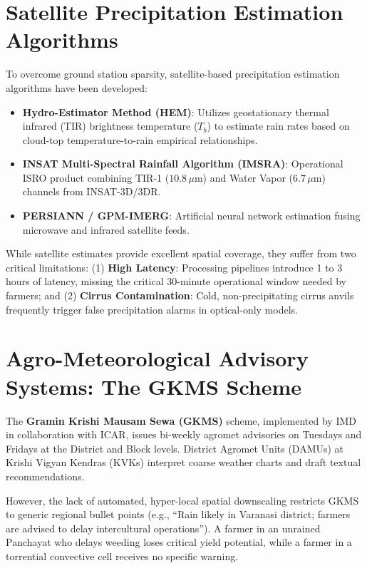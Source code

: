 \documentclass[11pt,a4paper,oneside]{report}
\begin{document}
\section{Satellite Precipitation Estimation Algorithms}
To overcome ground station sparsity, satellite-based precipitation estimation algorithms have been developed:
\begin{itemize}[leftmargin=*]
    \item \textbf{Hydro-Estimator Method (HEM)}: Utilizes geostationary thermal infrared (TIR) brightness temperature ($T_b$) to estimate rain rates based on cloud-top temperature-to-rain empirical relationships.
    \item \textbf{INSAT Multi-Spectral Rainfall Algorithm (IMSRA)}: Operational ISRO product combining TIR-1 ($10.8\,\mu\text{m}$) and Water Vapor ($6.7\,\mu\text{m}$) channels from INSAT-3D/3DR.
    \item \textbf{PERSIANN / GPM-IMERG}: Artificial neural network estimation fusing microwave and infrared satellite feeds.
\end{itemize}
While satellite estimates provide excellent spatial coverage, they suffer from two critical limitations: (1) \textbf{High Latency}: Processing pipelines introduce 1 to 3 hours of latency, missing the critical 30-minute operational window needed by farmers; and (2) \textbf{Cirrus Contamination}: Cold, non-precipitating cirrus anvils frequently trigger false precipitation alarms in optical-only models.

\section{Agro-Meteorological Advisory Systems: The GKMS Scheme}
The \textbf{Gramin Krishi Mausam Sewa (GKMS)} scheme, implemented by IMD in collaboration with ICAR, issues bi-weekly agromet advisories on Tuesdays and Fridays at the District and Block levels. District Agromet Units (DAMUs) at Krishi Vigyan Kendras (KVKs) interpret coarse weather charts and draft textual recommendations.

However, the lack of automated, hyper-local spatial downscaling restricts GKMS to generic regional bullet points (e.g., ``Rain likely in Varanasi district; farmers are advised to delay intercultural operations''). A farmer in an unrained Panchayat who delays weeding loses critical yield potential, while a farmer in a torrential convective cell receives no specific warning.
\end{document}
